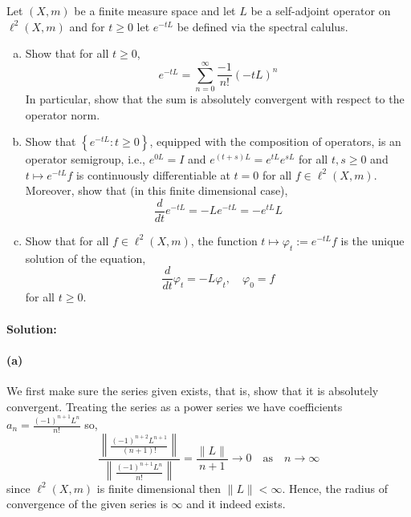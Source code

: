 Let $(X,m)$ be a finite measure space and let $L$ be a self-adjoint operator on $\ell^{2}(X,m)$ and for $t\geq 0$ let $e^{-tL}$ be defined via the spectral calulus.
\begin{enumerate}[(a)]
	\item 
		Show that for all $t\geq 0$,
		\begin{equation*}
			e^{-tL} = \sum_{n=0}^{\infty}\frac{-1}{n!}(-tL)^{n}
		\end{equation*}
		In particular, show that the sum is absolutely convergent with respect to the operator norm.
	\item 
		Show that $\left\{e^{-tL} \colon t\geq 0\right\}$, equipped with the composition of operators, is an operator semigroup, i.e., $e^{0L}=I$ and $e^{(t+s)L}=e^{tL}e^{sL}$ for all $t,s\geq 0$ and $t\mapsto e^{-tL}f$ is continuously differentiable at $t=0$ for all $f\in\ell^{2}(X,m)$. Moreover, show that (in this finite dimensional case),
		\begin{equation*}
			\frac{d}{dt}e^{-tL} = -Le^{-tL} = -e^{tL}L
		\end{equation*}
	\item 
		Show that for all $f\in\ell^{2}(X,m)$, the function $t\mapsto \varphi_{t}:=e^{-tL}f$ is the unique solution of the equation,
		\begin{equation*}
			\frac{d}{dt}\varphi_{t} = -L\varphi_{t}, \quad \varphi_{0}=f
		\end{equation*}
		for all $t\geq 0$.
\end{enumerate}

\paragraph{Solution:}

\paragraph{(a)}
We first make sure the series given exists, that is, show that it is absolutely convergent. Treating the series as a power series we have coefficients $a_{n}=\frac{(-1)^{n+1}L^{n}}{n!}$ so,
\begin{equation*}
	\frac{\left\|\frac{(-1)^{n+2}L^{n+1}}{(n+1)!}\right\|}{\left\|\frac{(-1)^{n+1}L^{n}}{n!}\right\|} = \frac{\|L\|}{n+1}\to 0 \quad \text{as} \quad n\to\infty
\end{equation*}
since $\ell^{2}(X,m)$ is finite dimensional then $\|L\|<\infty$. Hence, the radius of convergence of the given series is $\infty$ and it indeed exists.


